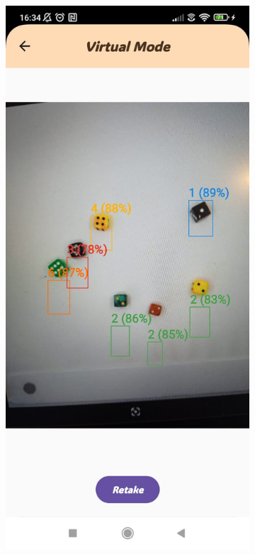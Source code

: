 \begin{figure}[ht!]
    \centering
    \begin{subfigure}[b]{0.27\textwidth}
        \includegraphics[width=\textwidth]{img/virtual screen.jpg}

\end{subfigure}
\end{figure}

